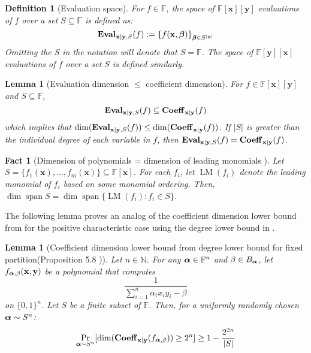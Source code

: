 \documentclass[11pt]{article}
\newtheorem{lemma}[theorem]{Lemma}
\newtheorem{definition}[theorem]{Definition}
\newtheorem{fact}[theorem]{Fact}
\newcommand{\Boo}{\{0,1 \}}
\newcommand{\F}{\mathbb{F}}
\begin{document}
\begin{definition}[Evaluation space]
    For $f\in \F$, the \emph{space of $\F[\mathbf{x}][\mathbf{y}]$ evaluations of $f$ over a set $S\subseteq \F$} is defined as: $$ \operatorname{\mathbf{Eval}}_{\mathbf{x}|\mathbf{y},S}(f) := \left\{ f(\mathbf{x},\boldsymbol{\beta}) \right\}_{\boldsymbol{\beta}\in S^{|\mathbf{y}|}}$$ 
    Omitting the $S$ in the notation will denote that $S = \F$. The \emph{space of $\F[\mathbf{y}][\mathbf{x}]$ evaluations of $f$ over a set $S$} is defined similarly. 
\end{definition}

\begin{lemma}[Evaluation dimension $\leq$ coefficient dimension]\label{lem:coeff vs eval}
    For $f\in \F[\mathbf{x}][\mathbf{y}]$ and $S\subseteq \F$, $$\operatorname{\mathbf{Eval}}_{\mathbf{x}|\mathbf{y},S}(f) \subseteq \operatorname{\mathbf{Coeff}}_{\mathbf{x}|\mathbf{y}}(f)$$ which implies that $\dim(\operatorname{\mathbf{Eval}}_{\mathbf{x}|\mathbf{y},S}(f)) \leq \dim(\operatorname{\mathbf{Coeff}}_{\mathbf{x}|\mathbf{y}}(f))$. If $|S|$ is greater than the individual degree of each variable in $f$, then $\operatorname{\mathbf{Eval}}_{\mathbf{x}|\mathbf{y},S}(f) = \operatorname{\mathbf{Coeff}}_{\mathbf{x}|\mathbf{y}}(f)$.
\end{lemma}

\begin{fact}[Dimension of polynomials = dimension of leading monomials \cite{Forbes-thesis}]\label{fact:dim of leading monomials}
    Let $S = \{f_1(\mathbf{x}), \dots, f_m(\mathbf{x})\} \subseteq \F[\mathbf{x}]$. For each $f_i$, let $\operatorname{LM}(f_i)$ denote the leading monomial of $f_i$ based on some monomial ordering. Then, $\dim \operatorname{span} S = \dim \operatorname{span}\{\operatorname{LM}(f_i): f_i \in S\}$.
\end{fact}

The following lemma proves an analog of the coefficient dimension lower bound from \cite{FSTW21} for the positive characteristic case using the degree lower bound in .

\begin{lemma}[Coefficient dimension lower bound from degree lower bound for fixed partition(Proposition 5.8 \cite{FSTW21})]\label{lem: fixed partition coeff dim lbd}
    Let $n\in \mathbb{N}$. For any $\bfalpha \in \F^n$ and $\beta \in B_{\boldsymbol{\alpha}}$, let $f_{\boldsymbol{\alpha},\beta}(\mathbf{x},\mathbf{y})$ be a polynomial that computes $$\frac{1}{\sum_{i=1}^n \alpha_i x_iy_i - \beta}$$ on $\Boo^n$. Let $S$ be a finite subset of $\F$. Then, for a uniformly randomly chosen $\boldsymbol{\alpha} \sim S^n$: $$ \Pr_{\boldsymbol{\alpha} \sim S^n}[\dim (\operatorname{\mathbf{Coeff}}_{\mathbf{x}|\mathbf{y}}(f_{\boldsymbol{\alpha},\beta})) \geq 2^n] \geq 1-\frac{2^{2n}}{|S|} $$
\end{lemma}
\end{document}
